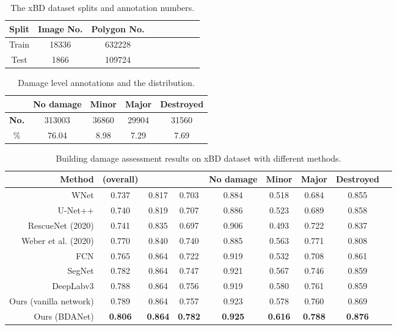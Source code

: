 \documentclass[journal]{IEEEtran}
\begin{document}
\begin{table}[tp]
	\centering
	\caption{The xBD dataset splits and annotation numbers. }
	\setlength{\tabcolsep}{2.6mm} {
		\begin{tabular}{c|cccccccc}
			\hline \hline
    {Split}     & {Image No.}     & {Polygon No.} \\
    \hline
    Train & 18336  &  632228     \\
    Test    & 1866  & 109724     \\
\hline	\hline	
	\end{tabular}}
	\label{tabDatasplit}
\end{table}

\begin{table}[tp]
	\centering
	\caption{Damage level annotations and the distribution.}
	\setlength{\tabcolsep}{2.6mm} {
		\begin{tabular}{c|cccc}
			\hline \hline
       & No damage    & Minor & Major & Destroyed \\
    \hline
   \textbf{No.} & 313003  &  36860    & 29904 & 31560 \\
   \%  &     76.04     & 8.98 & 7.29 &7.69              \\
\hline	\hline	
	\end{tabular}}
	\label{tabLevelDis}
\end{table}


\begin{table*}[!t]
	\centering
	\caption{Building damage assessment results on xBD dataset with different methods. }
	\setlength{\tabcolsep}{2.6mm} {
		\begin{tabular}{r|cccccccc}
			\hline \hline
	Method &  (overall) &  &   & No damage    & Minor & Major & Destroyed \\
	\hline
	WNet \cite{houWNetCDGANBitemporal2020} & 0.737&	0.817&	0.703	&0.884	&0.518&	0.684&	0.855 \\
	U-Net++ \cite{pengEndtoEndChangeDetection2019} & 0.740&	0.819	&0.707&	0.886&	0.523&	0.689&	0.858\\
       \hline
    RescueNet \cite{gupta2020rescuenet} (2020) & 0.741 & 0.835 &	0.697 &	0.906 &	0.493 &	0.722 &	0.837 \\
   Weber et al. \cite{weber2020building} (2020)  & 0.770 &	0.840 &	0.740 &	0.885 &	0.563 &	0.771 &	0.808   \\
   \hline
   FCN \cite{Long_2015_CVPR} & 0.765&	0.864&	0.722&	0.919&	0.532&	0.708&	0.861 \\
   SegNet \cite{badrinarayananSegNetDeepConvolutional2017} & 0.782&	0.864&	0.747&	0.921&	0.567&	0.746&	0.859
\\
   DeepLabv3 \cite{chen2017rethinking} &0.788&	0.864&	0.756&	0.919&	0.580&	0.761&	0.859
 \\
   Ours (vanilla network) & 0.789 & 0.864 &	0.757 &	0.923 &	0.578 &	0.760 &	0.869  \\
   Ours (BDANet) &  \textbf{0.806} &	\textbf{0.864} & \textbf{0.782} &	\textbf{0.925} &	\textbf{0.616} &	\textbf{0.788} &	\textbf{0.876}   \\
\hline	\hline	
	\end{tabular}}
	\label{tabResults}
\end{table*}
\end{document}
